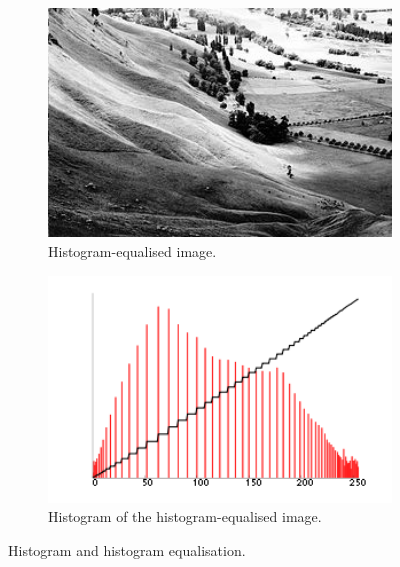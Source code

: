 \documentclass[12pt, conference]{IEEEtran}
\begin{document}
\begin{figure}[htbp]
\begin{subfigure}{0.4\textwidth}
        \label{C original histogram}
    \end{subfigure}
    \begin{subfigure}{0.4\textwidth}
        \centering
        \includegraphics[width=1\textwidth]{Images/C equalised.jpg}
        \caption{Histogram-equalised image.}
        \label{C equalised}
    \end{subfigure}
    \begin{subfigure}{0.4\textwidth}
        \centering
        \includegraphics[width=1\textwidth]{Images/C equalised histogram.png}
        \caption{Histogram of the histogram-equalised image.}
        \label{C equalised histogram}
    \end{subfigure}
    \caption{Histogram and histogram equalisation.}
    \label{Histogram and histogram equalisation}
\end{figure}
\end{document}
